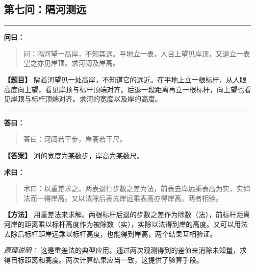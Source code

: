 \documentclass[11pt,a4paper]{article}
\newenvironment{mathproblem}[1][]{%
  \medskip\noindent\rule{\textwidth}{0.4pt}%
  \par\noindent{\Large\bfseries\color{sectioncolor}#1}\par\nopagebreak%
  \smallskip%
}{%
  \par\noindent\rule{\textwidth}{0.4pt}\medskip%
}
\newcommand{\wenlabel}{\textbf{\color{origcolor}问曰：}}
\newcommand{\dalabel}{\textbf{\color{origcolor}答曰：}}
\newcommand{\shulabel}{\textbf{\color{origcolor}术曰：}}
\newcommand{\modwenlabel}{\textbf{\color{modcolor}【题目】}}
\newcommand{\moddalabel}{\textbf{\color{modcolor}【答案】}}
\newcommand{\modshulabel}{\textbf{\color{modcolor}【方法】}}
\begin{document}
\subsection*{第七问：隔河测远}

\begin{mathproblem}[\textbf{第七问：隔河测远}]

\begin{originaltext}
\wenlabel
\begin{quote}
\textcolor{origcolor}{%
问：隔河望一高岸，不知其远。平地立一表，人目上望见岸顶，又退立一表望之亦见岸顶。求河阔及岸高。
}
\end{quote}
\end{originaltext}

\begin{moderntext}
\modwenlabel
隔着河望见一处高岸，不知道它的远近。在平地上立一根标杆，从人眼高度向上望，看见岸顶与标杆顶端对齐。后退一段距离再立一根标杆，向上望也看见岸顶与标杆顶端对齐。求河的宽度以及岸的高度。
\end{moderntext}

\end{mathproblem}

\begin{originaltext}
\dalabel
\begin{quote}
\textcolor{origcolor}{%
答曰：河阔若干步，岸高若干尺。
}
\end{quote}
\end{originaltext}

\begin{moderntext}
\moddalabel
河的宽度为某数步，岸高为某数尺。
\end{moderntext}

\begin{originaltext}
\shulabel
\begin{quote}
\textcolor{origcolor}{%
术曰：以重差求之。两表退行步数之差为法，前表去岸远乘表高为实，实如法而一得岸高。又以法除后表去岸远乘表高亦得岸高，两者相验。
}
\end{quote}
\end{originaltext}

\begin{moderntext}
\modshulabel
用重差法来求解。两根标杆后退的步数之差作为除数（法），前标杆距离河岸的距离乘以标杆高度作为被除数（实），实除以法得到岸的高度。又可以用法去除后标杆距岸远乘以标杆高度，也能得到岸高，两个结果互相验证。

\textit{原理说明：} 这是重差法的典型应用。通过两次观测得到的差值来消除未知量，求得目标距离和高度。两次计算结果应当一致，这提供了验算手段。
\end{moderntext}
\end{document}
